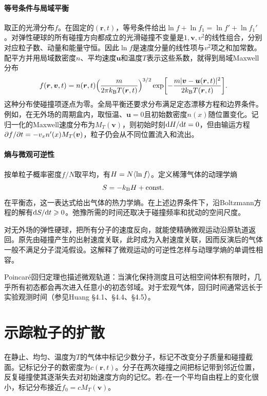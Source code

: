 \paragraph{等号条件与局域平衡}
取正的光滑分布$f$。在固定的$(\bm r,t)$，等号条件给出$\ln f + \ln f_1 = \ln f' + \ln f_1'$。对弹性硬球的所有碰撞方向都成立的光滑碰撞不变量是$1,\bm v,v^2$的线性组合，分别对应粒子数、动量和能量守恒。因此$\ln f$是速度分量的线性项与$v^2$项之和加常数。配平方并用局域数密度$n$、平均速度$\bm u$和温度$T$表示这些系数，就得到局域Maxwell分布
\begin{equation}
	\label{eq:sm-local-maxwellian}
	f(\bm r,\bm v,t) = n(\bm r,t)\Bigl(\frac{m}{2\pi k_{\mathrm{B}} T(\bm r,t)}\Bigr)^{3/2}
	\exp\biggl[-\frac{m\lvert\bm v - \bm u(\bm r,t)\rvert^2}{2k_{\mathrm{B}} T(\bm r,t)}\biggr].
\end{equation}
这种分布使碰撞项逐点为零。全局平衡还要求分布满足定态漂移方程和边界条件。例如，在无外场的周期盒内，取恒温、$\bm u = 0$且初始数密度$n(x)$随位置变化。记归一化的Maxwell速度分布为$M_T(\bm v)$，则初始时刻$\mathop{}\!\mathrm{d} H/\mathrm{d} t = 0$，但由输运方程$\partial f/\partial t = -v_x n'(x)M_T(\bm v)$，粒子仍会从不同位置流入和流出。

\paragraph{熵与微观可逆性}
按单粒子概率密度$f/N$取平均，有$H = N\langle\ln f\rangle$。定义稀薄气体的动理学熵
\begin{equation}
	S = -k_{\mathrm{B}} H + \mathrm{const}.
\end{equation}
在平衡态，这一表达式给出气体的热力学熵。在上述边界条件下，沿Boltzmann方程的解有$\mathop{}\!\mathrm{d} S/\mathrm{d} t \geqslant 0$。弛豫所需的时间还取决于碰撞频率和扰动的空间尺度。

对无外场的弹性硬球，把所有分子的速度反向，就能使精确微观运动沿原轨道返回。原先由碰撞产生的出射速度关联，此时成为入射速度关联，因而反演后的气体一般不满足分子混沌假设。这解释了微观运动的可逆性怎样与动理学熵的单调性相容。

Poincaré回归定理也描述微观轨道：当演化保持测度且可达相空间体积有限时，几乎所有初态都会再次进入任意小的初态邻域。对于宏观气体，回归时间通常远长于实验观测时间（参见Huang \S 4.1、\S 4.4、\S 4.5）。

\section{示踪粒子的扩散}
在静止、均匀、温度为$T$的气体中标记少数分子，标记不改变分子质量和碰撞截面。记标记分子的数密度为$c(\bm r,t)$。分子在两次碰撞之间把标记带到邻近位置，反复碰撞使其逐渐失去对初始速度方向的记忆。若$c$在一个平均自由程上的变化很小，标记分布接近$f_0 = cM_T(\bm v)$。

